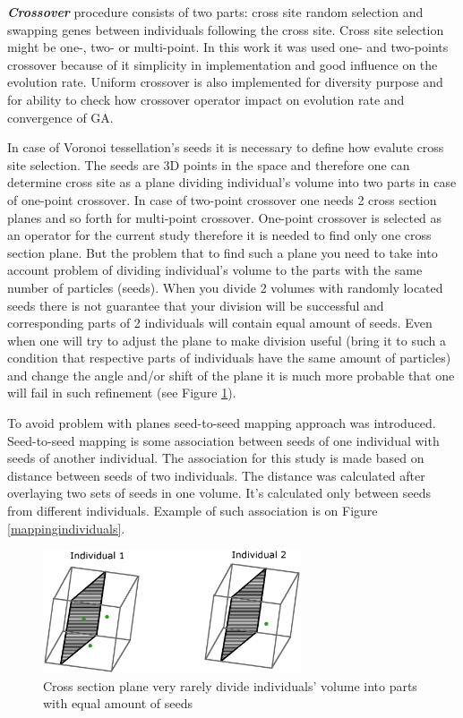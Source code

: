 \documentclass[12pt]{report}
\begin{document}
\textit{\textbf{Crossover}} procedure consists of two parts: cross site random selection and swapping genes between individuals following the cross site. Cross site selection might be one-, two- or multi-point. In this work it was used one- and two-points crossover because of it simplicity in implementation and good influence on the evolution rate. Uniform crossover is also implemented for diversity purpose and for ability to check how crossover operator impact on evolution rate and convergence of GA.

In case of Voronoi tessellation's seeds it is necessary to define how evalute cross site selection. The seeds are 3D points in the space and therefore one can determine cross site as a plane dividing individual's volume into two parts in case of one-point crossover. In case of two-point crossover one needs 2 cross section planes and so forth for multi-point crossover. One-point crossover is selected as an operator for the current study therefore it is needed to find only one cross section plane. But the problem that to find such a plane you need to take into account problem of dividing individual's volume to the parts with the same number of particles (seeds). When you divide 2 volumes with randomly located seeds there is not guarantee that your division will be successful and corresponding parts of 2 individuals will contain equal amount of seeds. Even when one will try to adjust the plane to make division useful (bring it to such a condition that respective parts of individuals have the same amount of particles) and change the angle and/or shift of the plane it is much more probable that one will fail in such refinement (see Figure \ref{faildivision}).

To avoid problem with planes seed-to-seed mapping approach was introduced. Seed-to-seed mapping is some association between seeds of one individual with seeds of another individual. The association for this study is made based on distance between seeds of two individuals. The distance was calculated after overlaying two sets of seeds in one volume. It's calculated only between seeds from different individuals. Example of such association is on Figure \ref{mappingindividuals}.

\begin{figure}
    \centering
    \includegraphics[width=3.0in]{cubes_cross_section}
    \caption{Cross section plane very rarely divide individuals' volume into parts with equal amount of seeds}
    \label{faildivision}
\end{figure}
\end{document}
